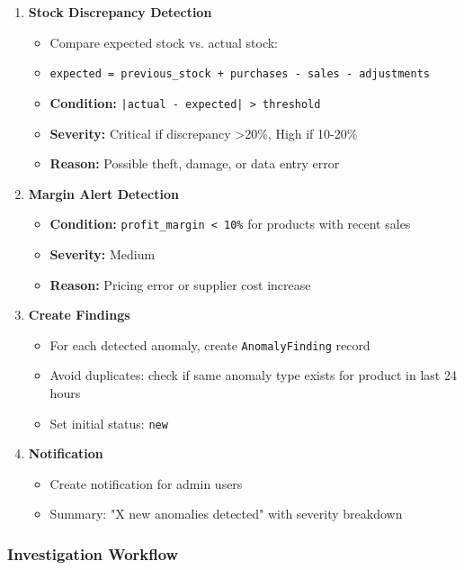 \begin{enumerate}[leftmargin=*]
    \item \textbf{Stock Discrepancy Detection}
    \begin{itemize}
        \item Compare expected stock vs. actual stock:
        \item \texttt{expected = previous\_stock + purchases - sales - adjustments}
        \item \textbf{Condition:} \texttt{|actual - expected| > threshold}
        \item \textbf{Severity:} Critical if discrepancy >20\%, High if 10-20\%
        \item \textbf{Reason:} Possible theft, damage, or data entry error
    \end{itemize}
    
    \item \textbf{Margin Alert Detection}
    \begin{itemize}
        \item \textbf{Condition:} \texttt{profit\_margin < 10\%} for products with recent sales
        \item \textbf{Severity:} Medium
        \item \textbf{Reason:} Pricing error or supplier cost increase
    \end{itemize}
    
    \item \textbf{Create Findings}
    \begin{itemize}
        \item For each detected anomaly, create \texttt{AnomalyFinding} record
        \item Avoid duplicates: check if same anomaly type exists for product in last 24 hours
        \item Set initial status: \texttt{new}
    \end{itemize}
    
    \item \textbf{Notification}
    \begin{itemize}
        \item Create notification for admin users
        \item Summary: "X new anomalies detected" with severity breakdown
    \end{itemize}
\end{enumerate}

\subsubsection{Investigation Workflow}

